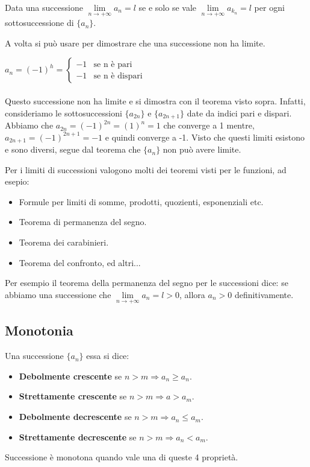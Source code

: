 \begin{theorem}
Data una successione $\lim\limits_{n\to +\infty}a_n = l$ se e solo se vale $\lim\limits_{n\to +\infty}a_{k_n} = l    $ per ogni sottosuccessione di $\{a_n\}$.
\end{theorem}
\hspace{-15pt} A volta si può usare per dimostrare che una successione non ha limite.
\begin{example}
$a_n= (-1)^h = \begin{cases}-1 & \text{se n è pari} \\ -1 & \text{se n è dispari} \end{cases}$ \\\\
Questo successione non ha limite e si dimostra con il teorema visto sopra. Infatti, consideriamo le sottosuccessioni $\{a_{2n}\}$ e $\{a_{2n+1}\}$ date da indici pari e dispari. \\
Abbiamo che $a_{2n} = (-1)^{2n} = (1)^n = 1$ che converge a 1 mentre, $a_{2n+1} = (-1)^{2n+1} = -1$ e quindi converge a -1. Visto che questi limiti esistono e sono diversi, segue dal teorema che $\{a_n\}$ non può avere limite.
\end{example}

\begin{observation}
Per i limiti di successioni valogono molti dei teoremi visti per le funzioni, ad esepio:
\begin{itemize}
    \item Formule per limiti di somme, prodotti, quozienti, esponenziali etc.
    \item Teorema di permanenza del segno.
    \item Teorema dei carabinieri.
    \item Teorema del confronto, ed altri...
\end{itemize}
\end{observation}

\begin{example}
Per esempio il teorema della permanenza del segno per le successioni dice: se abbiamo una successione che $\lim\limits_{n\to +\infty} a_n = l > 0$, allora $a_n > 0$ definitivamente.
\end{example}

\subsection{Monotonia}
\begin{definition}[Monotonia]
Una successione $\{a_n\}$ essa si dice:
\begin{itemize}
    \item \textbf{Debolmente crescente} se $n>m \Longrightarrow a_n \geq a_n$.
    \item \textbf{Strettamente crescente} se $n > m \Longrightarrow a > a_m$.
    \item \textbf{Debolmente decrescente} se $n > m \Longrightarrow a_n \leq a_m$.
    \item \textbf{Strettamente decrescente} se $n > m \Longrightarrow a_n < a_m$.
\end{itemize}
Successione è monotona quando vale una di queste 4 proprietà.
\end{definition}

